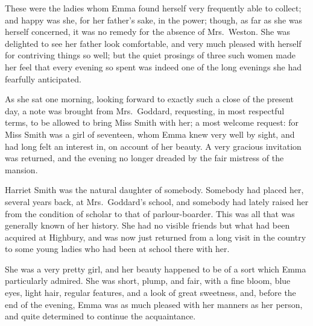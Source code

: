 These were the ladies whom Emma found herself very frequently
able to collect; and happy was she, for her father's sake,
in the power; though, as far as she was herself concerned,
it was no remedy for the absence of Mrs.\ Weston.  She was delighted
to see her father look comfortable, and very much pleased with
herself for contriving things so well; but the quiet prosings
of three such women made her feel that every evening so spent
was indeed one of the long evenings she had fearfully anticipated.

As she sat one morning, looking forward to exactly such a close
of the present day, a note was brought from Mrs.\ Goddard, requesting,
in most respectful terms, to be allowed to bring Miss Smith with her;
a most welcome request: for Miss Smith was a girl of seventeen,
whom Emma knew very well by sight, and had long felt an interest in,
on account of her beauty.  A very gracious invitation was returned,
and the evening no longer dreaded by the fair mistress of the mansion.

Harriet Smith was the natural daughter of somebody.  Somebody had
placed her, several years back, at Mrs.\ Goddard's school,
and somebody had lately raised her from the condition of scholar
to that of parlour-boarder. This was all that was generally known
of her history.  She had no visible friends but what had been
acquired at Highbury, and was now just returned from a long visit
in the country to some young ladies who had been at school there with her.

She was a very pretty girl, and her beauty happened to be of a sort
which Emma particularly admired.  She was short, plump, and fair,
with a fine bloom, blue eyes, light hair, regular features,
and a look of great sweetness, and, before the end of the evening,
Emma was as much pleased with her manners as her person, and quite
determined to continue the acquaintance.


